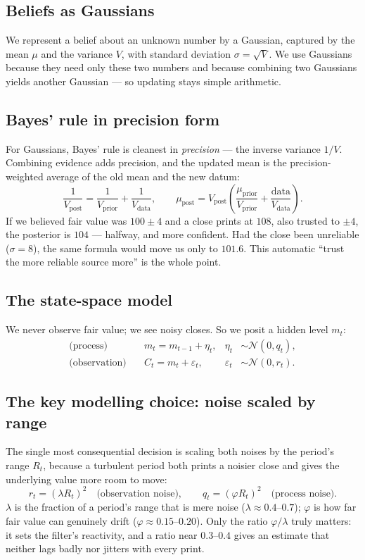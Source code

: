 \documentclass[11pt]{article}
\begin{document}
\subsection{Beliefs as Gaussians}
We represent a belief about an unknown number by a Gaussian, captured by the mean $\mu$ and the
variance $V$, with standard deviation $\sigma=\sqrt V$. We use Gaussians because they need only
these two numbers and because combining two Gaussians yields another Gaussian --- so updating
stays simple arithmetic.

\subsection{Bayes' rule in precision form}
For Gaussians, Bayes' rule is cleanest in \emph{precision} --- the inverse variance $1/V$.
Combining evidence adds precision, and the updated mean is the precision-weighted average of the
old mean and the new datum:
\begin{equation}
\frac{1}{V_{\text{post}}}=\frac{1}{V_{\text{prior}}}+\frac{1}{V_{\text{data}}},
\qquad
\mu_{\text{post}}=V_{\text{post}}\left(\frac{\mu_{\text{prior}}}{V_{\text{prior}}}
+\frac{\text{data}}{V_{\text{data}}}\right).
\end{equation}
If we believed fair value was $100\pm4$ and a close prints at $108$, also trusted to $\pm4$, the
posterior is $104$ --- halfway, and more confident. Had the close been unreliable ($\sigma=8$),
the same formula would move us only to $101.6$. This automatic ``trust the more reliable source
more'' is the whole point.

\subsection{The state-space model}
We never observe fair value; we see noisy closes. So we posit a hidden level $m_t$:
\begin{align}
\text{(process)}\quad & m_t=m_{t-1}+\eta_t, & \eta_t &\sim\mathcal N(0,q_t),\\
\text{(observation)}\quad & C_t=m_t+\varepsilon_t, & \varepsilon_t &\sim\mathcal N(0,r_t).
\end{align}

\subsection{The key modelling choice: noise scaled by range}
The single most consequential decision is scaling both noises by the period's range $R_t$,
because a turbulent period both prints a noisier close and gives the underlying value more room
to move:
\begin{equation}
r_t=(\lambda R_t)^2 \quad\text{(observation noise)},\qquad
q_t=(\varphi R_t)^2 \quad\text{(process noise)}.
\end{equation}
$\lambda$ is the fraction of a period's range that is mere noise ($\lambda\approx0.4$--$0.7$);
$\varphi$ is how far fair value can genuinely drift ($\varphi\approx0.15$--$0.20$). Only the
ratio $\varphi/\lambda$ truly matters: it sets the filter's reactivity, and a ratio near
$0.3$--$0.4$ gives an estimate that neither lags badly nor jitters with every print.
\end{document}
